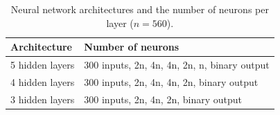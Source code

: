 \documentclass[10pt, letterpaper]{article}
\begin{document}
\begin{table}[!ht]
	\caption{Neural network architectures and the number of neurons per layer ($n=560$).}	\label{tab:architectures}
	\centering
	\begin{tabular}{l l}
		\toprule
		Architecture & Number of neurons \\
		\midrule
		 5 hidden layers & 300 inputs, 2n, 4n, 4n, 2n, n, binary output \\
		 4  hidden layers & 300 inputs, 2n, 4n, 4n, 2n, binary output \\
		 3 hidden layers & 300 inputs, 2n, 4n, 2n, binary output \\
		\bottomrule
	\end{tabular}
\end{table}
\end{document}
